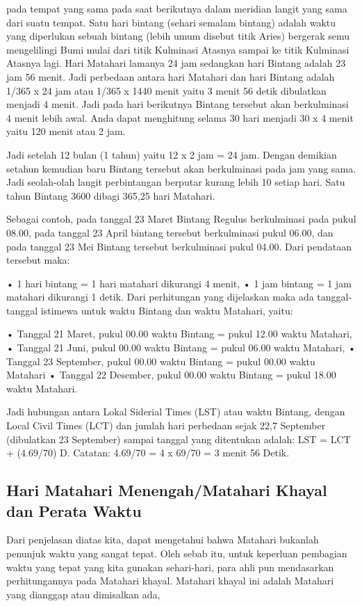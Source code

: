 {{ pada tempat yang sama pada saat berikutnya dalam meridian langit yang 
 sama dari suatu tempat. Satu hari bintang (sehari semalam bintang) adalah 
 waktu yang diperlukan sebuah bintang (lebih umum disebut titik Aries) bergerak semu
 mengelilingi Bumi mulai dari titik Kulminasi Atasnya sampai ke titik Kulminasi Atasnya 
 lagi. Hari Matahari lamanya 24 jam sedangkan hari Bintang adalah 23 jam 56 menit. 
 Jadi perbedaan antara hari Matahari dan  hari Bintang adalah 1/365 x 24 jam atau 
 1/365 x 1440 menit yaitu 3 menit 56 detik  dibulatkan menjadi 4 menit. 
 Jadi pada hari berikutnya Bintang tersebut akan  berkulminasi 4 menit lebih awal.
 Anda dapat menghitung selama 30 hari menjadi  30 x 4 menit yaitu 120 menit atau 2 jam. 

Jadi setelah 12 bulan (1 tahun) yaitu  12 x 2 jam = 24 jam. Dengan demikian setahun
 kemudian baru Bintang tersebut akan berkulminasi pada jam yang sama. 
 Jadi seolah-olah langit perbintangan berputar kurang lebih 10 setiap hari. 
 Satu tahun Bintang 3600 dibagi 365,25 hari Matahari.

Sebagai contoh, pada tanggal 23 Maret Bintang Regulus berkulminasi pada pukul 08.00,
 pada tanggal 23 April bintang tersebut berkulminasi pukul 06.00, dan pada tanggal 23 Mei 
 Bintang tersebut berkulminasi pukul 04.00. Dari pendataan tersebut maka: 

 • 1 hari bintang = 1 hari matahari dikurangi 4 menit, 
 • 1 jam bintang = 1 jam matahari dikurangi 1 detik. 
 Dari perhitungan yang dijelaskan maka ada tanggal-tanggal istimewa 
 untuk waktu Bintang dan waktu Matahari, yaitu:
 
	• Tanggal 21 Maret, pukul 00.00 waktu Bintang = pukul 12.00 waktu Matahari,
	• Tanggal 21 Juni, pukul 00.00 waktu Bintang = pukul 06.00 waktu Matahari,
	• Tanggal 23 September, pukul 00.00 waktu Bintang = pukul 00.00 waktu Matahari
	• Tanggal 22 Desember, pukul 00.00 waktu Bintang = pukul 18.00 waktu Matahari.
	

 Jadi hubungan antara Lokal Siderial Times (LST) atau waktu Bintang, 
 dengan Local Civil Times (LCT) dan jumlah hari perbedaan sejak 22,7 September 
 (dibulatkan 23 September) sampai tanggal yang ditentukan adalah:
 LST = LCT + (4.69/70) D. Catatan: 4.69/70 = 4 x 69/70 = 3 menit 56 Detik.	
 
\subsection{Hari Matahari Menengah/Matahari Khayal dan Perata Waktu}
 Dari penjelasan diatas kita, dapat mengetahui bahwa Matahari bukanlah penunjuk 
 waktu yang sangat tepat. Oleh sebab itu, untuk keperluan pembagian waktu yang tepat
 yang kita gunakan sehari-hari, para ahli pun mendasarkan perhitungannya pada Matahari
 khayal. Matahari khayal ini adalah Matahari yang dianggap atau dimisalkan ada, 

}}
